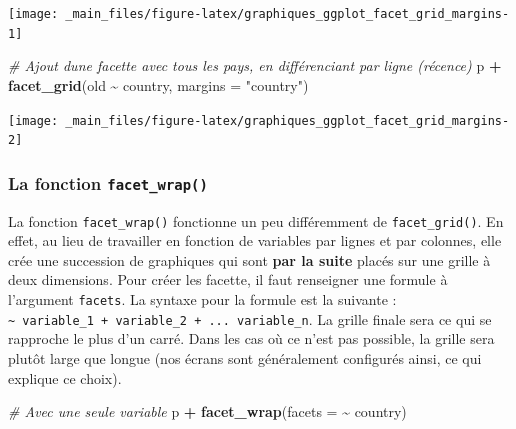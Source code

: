 \documentclass[
  11pt,
]{book}
\newenvironment{Shaded}{\begin{snugshade}}{\end{snugshade}}
\newcommand{\CommentTok}[1]{\textcolor[rgb]{0.56,0.35,0.01}{\textit{#1}}}
\newcommand{\DataTypeTok}[1]{\textcolor[rgb]{0.13,0.29,0.53}{#1}}
\newcommand{\KeywordTok}[1]{\textcolor[rgb]{0.13,0.29,0.53}{\textbf{#1}}}
\newcommand{\NormalTok}[1]{#1}
\newcommand{\OperatorTok}[1]{\textcolor[rgb]{0.81,0.36,0.00}{\textbf{#1}}}
\newcommand{\StringTok}[1]{\textcolor[rgb]{0.31,0.60,0.02}{#1}}
\numberwithin{equation}{section}
\numberwithin{countremarque}{section}
\begin{document}
\begin{center}\texttt{[image: \_main\_files/figure-latex/graphiques\_ggplot\_facet\_grid\_margins-1]} \end{center}

\begin{Shaded}
\begin{Highlighting}[]
\CommentTok{\# Ajout d\textquotesingle{}une facette avec tous les pays, en différenciant par ligne (récence)}
\NormalTok{p }\OperatorTok{+}\StringTok{ }\KeywordTok{facet\_grid}\NormalTok{(old }\OperatorTok{\textasciitilde{}}\StringTok{ }\NormalTok{country, }\DataTypeTok{margins =} \StringTok{"country"}\NormalTok{)}
\end{Highlighting}
\end{Shaded}

\begin{center}\texttt{[image: \_main\_files/figure-latex/graphiques\_ggplot\_facet\_grid\_margins-2]} \end{center}

\hypertarget{graphiques_ggplot_facet_wrap}{%
\subsubsection{\texorpdfstring{La fonction \texttt{facet\_wrap()}}{La fonction facet\_wrap()}}\label{graphiques_ggplot_facet_wrap}}

La fonction \texttt{facet\_wrap()} fonctionne un peu différemment de \texttt{facet\_grid()}. En effet, au lieu de travailler en fonction de variables par lignes et par colonnes, elle crée une succession de graphiques qui sont \textbf{par la suite} placés sur une grille à deux dimensions. Pour créer les facette, il faut renseigner une formule à l'argument \texttt{facets}. La syntaxe pour la formule est la suivante : \texttt{\textasciitilde{}\ variable\_1\ +\ variable\_2\ +\ ...\ variable\_n}. La grille finale sera ce qui se rapproche le plus d'un carré. Dans les cas où ce n'est pas possible, la grille sera plutôt large que longue (nos écrans sont généralement configurés ainsi, ce qui explique ce choix).

\begin{Shaded}
\begin{Highlighting}[]
\CommentTok{\# Avec une seule variable}
\NormalTok{p }\OperatorTok{+}\StringTok{ }\KeywordTok{facet\_wrap}\NormalTok{(}\DataTypeTok{facets =} \OperatorTok{\textasciitilde{}}\StringTok{ }\NormalTok{country)}
\end{Highlighting}
\end{Shaded}
\end{document}
